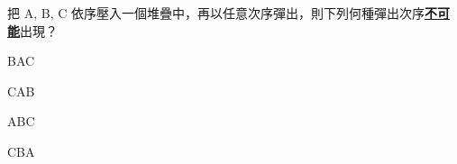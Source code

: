 \ifx\ntpcNinetyTwo\undefined[92學年基北區] \fi
把 A, B, C 依序壓入一個堆疊中，再以任意次序彈出，則下列何種彈出次序\underline{\textbf{不可能}}出現？
  \begin{optionlist}
  \item BAC
  \item CAB\label{ntpc-92-a26}
  \item ABC
  \item CBA
  \end{optionlist}